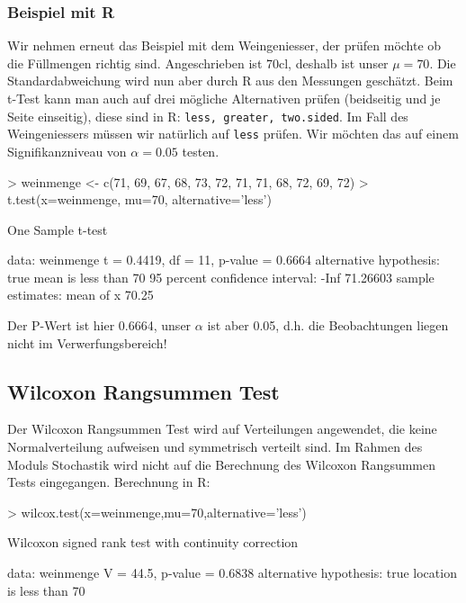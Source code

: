 \subsubsection{Beispiel mit R}
Wir nehmen erneut das Beispiel mit dem Weingeniesser, der prüfen möchte ob die 
Füllmengen richtig sind. Angeschrieben ist 70cl, deshalb ist unser $\mu=70$. 
Die Standardabweichung wird nun aber durch R aus den Messungen geschätzt. 
Beim t-Test kann man auch auf drei mögliche Alternativen prüfen 
(beidseitig und je Seite einseitig), diese sind in R: 
\verb!less, greater, two.sided!. Im Fall des Weingeniessers müssen wir 
natürlich auf \verb!less! prüfen. Wir möchten das auf einem Signifikanzniveau 
von $\alpha=0.05$ testen.
\begin{Schunk}
\begin{Sinput}
> weinmenge <- c(71, 69, 67, 68, 73, 72, 71, 71, 68, 72, 69, 72)
> t.test(x=weinmenge, mu=70, alternative='less')
\end{Sinput}
\begin{Soutput}
	One Sample t-test

data:  weinmenge
t = 0.4419, df = 11, p-value = 0.6664
alternative hypothesis: true mean is less than 70
95 percent confidence interval:
     -Inf 71.26603
sample estimates:
mean of x 
    70.25 
\end{Soutput}
\end{Schunk}

\noindent
Der P-Wert ist hier 0.6664, unser $\alpha$ ist aber 0.05, d.h. 
die Beobachtungen liegen nicht im Verwerfungsbereich!


\subsection{Wilcoxon Rangsummen Test}
Der Wilcoxon Rangsummen Test wird auf Verteilungen angewendet, die keine 
Normalverteilung aufweisen und symmetrisch verteilt sind. Im Rahmen des Moduls 
Stochastik wird nicht auf die Berechnung des Wilcoxon Rangsummen Tests 
eingegangen. Berechnung in R: 
\begin{Schunk}
\begin{Sinput}
> wilcox.test(x=weinmenge,mu=70,alternative='less')
\end{Sinput}
\begin{Soutput}
	Wilcoxon signed rank test with continuity correction

data:  weinmenge
V = 44.5, p-value = 0.6838
alternative hypothesis: true location is less than 70
\end{Soutput}
\end{Schunk}

